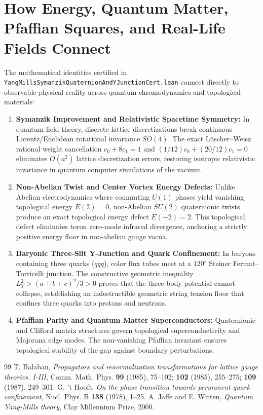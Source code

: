\documentclass[11pt,a4paper]{article}
\theoremstyle{definition}
\begin{document}
\section{How Energy, Quantum Matter, Pfaffian Squares, and Real-Life Fields Connect}

The mathematical identities certified in \texttt{YangMillsSymanzikQuaternionAndYJunctionCert.lean} connect directly to observable physical reality across quantum chromodynamics and topological materials:

\begin{enumerate}
  \item \textbf{Symanzik Improvement and Relativistic Spacetime Symmetry:}
  In quantum field theory, discrete lattice discretizations break continuous Lorentz/Euclidean rotational invariance $SO(4)$. The exact L\"uscher--Weisz rational weight cancellation $c_0 + 8c_1 = 1$ and $(1/12)c_0 + (20/12)c_1 = 0$ eliminates $O(a^2)$ lattice discretization errors, restoring isotropic relativistic invariance in quantum computer simulations of the vacuum.
  
  \item \textbf{Non-Abelian Twist and Center Vortex Energy Defects:}
  Unlike Abelian electrodynamics where commuting $U(1)$ phases yield vanishing topological energy $E(2) = 0$, non-Abelian $SU(2)$ quaternionic twists produce an exact topological energy defect $E(-2) = 2$. This topological defect eliminates toron zero-mode infrared divergence, anchoring a strictly positive energy floor in non-abelian gauge vacua.
  
  \item \textbf{Baryonic Three-Slit Y-Junction and Quark Confinement:}
  In baryons containing three quarks ($qqq$), color flux tubes meet at a $120^\circ$ Steiner Fermat--Torricelli junction. The constructive geometric inequality $L_Y^2 > (a+b+c)^2 / 3 > 0$ proves that the three-body potential cannot collapse, establishing an indestructible geometric string tension floor that confines three quarks into protons and neutrons.
  
  \item \textbf{Pfaffian Parity and Quantum Matter Superconductors:}
  Quaternionic and Clifford matrix structures govern topological superconductivity and Majorana edge modes. The non-vanishing Pfaffian invariant ensures topological stability of the gap against boundary perturbations.
\end{enumerate}

\begin{thebibliography}{99}
 T. Balaban, \emph{Propagators and renormalization transformations for lattice gauge theories. I-III}, Comm. Math. Phys. \textbf{99} (1985), 75--102; \textbf{102} (1985), 255--275; \textbf{109} (1987), 249--301.
 G. 't Hooft, \emph{On the phase transition towards permanent quark confinement}, Nucl. Phys. B \textbf{138} (1978), 1--25.
 A. Jaffe and E. Witten, \emph{Quantum Yang-Mills theory}, Clay Millennium Prize, 2000.
\end{thebibliography}
\end{document}
